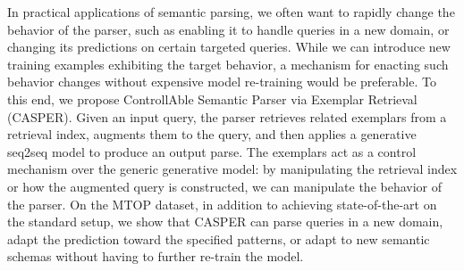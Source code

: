 In practical applications of semantic parsing, we often want to rapidly change the behavior of the parser, such as enabling it to handle queries in a new domain, or changing its predictions on certain targeted queries. While we can introduce new training examples exhibiting the target behavior, a mechanism for enacting such behavior changes without expensive model re-training would be preferable. To this end, we propose ControllAble Semantic Parser via Exemplar Retrieval (CASPER). Given an input query, the parser retrieves related exemplars from a retrieval index, augments them to the query, and then applies a generative seq2seq model to produce an output parse. The exemplars act as a control mechanism over the generic generative model: by manipulating the retrieval index or how the augmented query is constructed, we can manipulate the behavior of the parser. On the MTOP dataset, in addition to achieving state-of-the-art on the standard setup, we show that CASPER can parse queries in a new domain, adapt the prediction toward the specified patterns, or adapt to new semantic schemas without having to further re-train the model.
